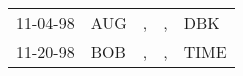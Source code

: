 \begin{supertabular}{lllll}
 11-04-98 &  AUG &  , &  , &   DBK \\
 11-20-98 &  BOB &  , &  , &  TIME \\
\end{supertabular}
